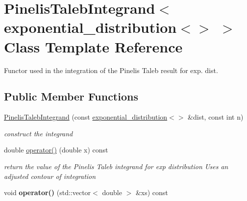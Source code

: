 \hypertarget{classPinelisTalebIntegrand_3_01exponential__distribution_3_4_01_4}{}\section{Pinelis\+Taleb\+Integrand$<$ exponential\+\_\+distribution$<$$>$ $>$ Class Template Reference}
\label{classPinelisTalebIntegrand_3_01exponential__distribution_3_4_01_4}


Functor used in the integration of the Pinelis Taleb result for exp. dist.  


\subsection*{Public Member Functions}
\begin{DoxyCompactItemize}
\item 
\mbox{\hyperlink{classPinelisTalebIntegrand_3_01exponential__distribution_3_4_01_4_acf3ed4eb347c425dfd458300ac1e717a}{Pinelis\+Taleb\+Integrand}} (const \mbox{\hyperlink{structexponential__distribution}{exponential\+\_\+distribution}}$<$$>$ \&dist, const int n)
\begin{DoxyCompactList}\small\item\em construct the integrand \end{DoxyCompactList}\item 
\mbox{\label{classPinelisTalebIntegrand_3_01exponential__distribution_3_4_01_4_a5a1d91c7452d9590e85d772fb68d2298}} 
double \mbox{\hyperlink{classPinelisTalebIntegrand_3_01exponential__distribution_3_4_01_4_a5a1d91c7452d9590e85d772fb68d2298}{operator()}} (double x) const
\begin{DoxyCompactList}\small\item\em return the value of the Pinelis Taleb integrand for exp distribution Uses an adjusted contour of integration \end{DoxyCompactList}\item 
\mbox{\label{classPinelisTalebIntegrand_3_01exponential__distribution_3_4_01_4_a66aef8eefd6f272f6f2cdea0462c66e5}} 
void {\bfseries operator()} (std\+::vector$<$ double $>$ \&xs) const
\end{DoxyCompactItemize}


